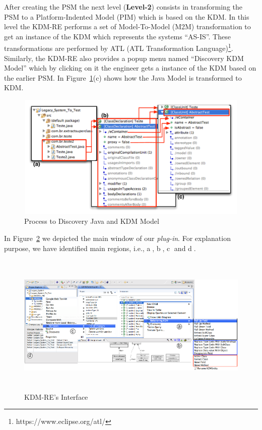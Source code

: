 After creating the PSM the next level (\textbf{Level-2}) consists in transforming the PSM to a Platform-Indented Model (PIM) which is based on the KDM. 
In this level the KDM-RE performs a set of  Model-To-Model (M2M) transformation to get an instance of the KDM which represents the systems ``AS-IS''. 
These transformations are performed by ATL (ATL Transformation Language)\footnote{https://www.eclipse.org/atl/}.
Similarly, the KDM-RE also provides a popup menu named ``Discovery KDM Model'' which by clicking on it the engineer gets a instance of the KDM based on the earlier PSM.
In Figure~\ref{fig:discovery_java_model}(c) shows how the Java Model is transformed to KDM.

\begin{figure}[!ht]
\centering
  \includegraphics[width=13cm, height=6cm]{figure/GerandoTODOS}
\caption{Process to Discovery Java and KDM Model}
\label{fig:discovery_java_model}
\end{figure}

In Figure~\ref{fig:interface} we depicted the main window of our \textit{plug-in}. 
For explanation purpose, we have identified main regions, i.e., \textcircled{a}, \textcircled{b}, \textcircled{c} and \textcircled{d}.

\begin{figure}[!ht]
\centering
  \includegraphics[width=15cm, height=6.8cm]{figure/ScreenShot_tool}
\caption{KDM-RE's Interface}
\label{fig:interface}
\end{figure}

